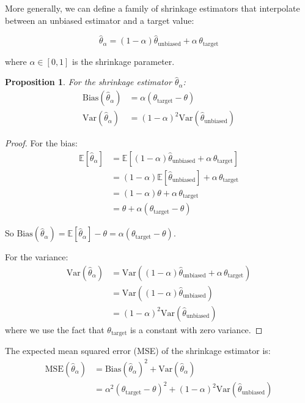 \documentclass{article}
\newtheorem{proposition}[theorem]{Proposition}
\begin{document}
More generally, we can define a family of shrinkage estimators that interpolate between an unbiased estimator and a target value:

\[
\hat{\theta}_{\alpha} = (1-\alpha) \hat{\theta}_{\text{unbiased}} + \alpha \, \theta_{\text{target}}
\]

where $\alpha \in [0,1]$ is the shrinkage parameter.

\begin{proposition}
For the shrinkage estimator $\hat{\theta}_{\alpha}$:
\begin{align*}
\text{Bias}(\hat{\theta}_{\alpha}) &= \alpha(\theta_{\text{target}} - \theta) \\
\text{Var}(\hat{\theta}_{\alpha}) &= (1-\alpha)^2 \text{Var}(\hat{\theta}_{\text{unbiased}})
\end{align*}
\end{proposition}

\begin{proof}
For the bias:
\begin{align*}
\mathbb{E}[\hat{\theta}_{\alpha}] &= \mathbb{E}[(1-\alpha) \hat{\theta}_{\text{unbiased}} + \alpha \, \theta_{\text{target}}] \\
&= (1-\alpha) \mathbb{E}[\hat{\theta}_{\text{unbiased}}] + \alpha \, \theta_{\text{target}} \\
&= (1-\alpha) \theta + \alpha \, \theta_{\text{target}} \\
&= \theta + \alpha(\theta_{\text{target}} - \theta)
\end{align*}

So $\text{Bias}(\hat{\theta}_{\alpha}) = \mathbb{E}[\hat{\theta}_{\alpha}] - \theta = \alpha(\theta_{\text{target}} - \theta)$.

For the variance:
\begin{align*}
\text{Var}(\hat{\theta}_{\alpha}) &= \text{Var}((1-\alpha) \hat{\theta}_{\text{unbiased}} + \alpha \, \theta_{\text{target}}) \\
&= \text{Var}((1-\alpha) \hat{\theta}_{\text{unbiased}}) \\
&= (1-\alpha)^2 \text{Var}(\hat{\theta}_{\text{unbiased}})
\end{align*}
where we use the fact that $\theta_{\text{target}}$ is a constant with zero variance.
\end{proof}

The expected mean squared error (MSE) of the shrinkage estimator is:
\begin{align*}
\text{MSE}(\hat{\theta}_{\alpha}) &= \text{Bias}(\hat{\theta}_{\alpha})^2 + \text{Var}(\hat{\theta}_{\alpha}) \\
&= \alpha^2(\theta_{\text{target}} - \theta)^2 + (1-\alpha)^2 \text{Var}(\hat{\theta}_{\text{unbiased}})
\end{align*}
\end{document}
